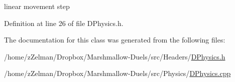 linear movement step 



Definition at line 26 of file D\-Physics.\-h.



The documentation for this class was generated from the following files\-:\begin{DoxyCompactItemize}
\item 
/home/z\-Zelman/\-Dropbox/\-Marshmallow-\/\-Duels/src/\-Headers/\hyperlink{DPhysics_8h}{D\-Physics.\-h}\item 
/home/z\-Zelman/\-Dropbox/\-Marshmallow-\/\-Duels/src/\-Physics/\hyperlink{DPhysics_8cpp}{D\-Physics.\-cpp}\end{DoxyCompactItemize}
